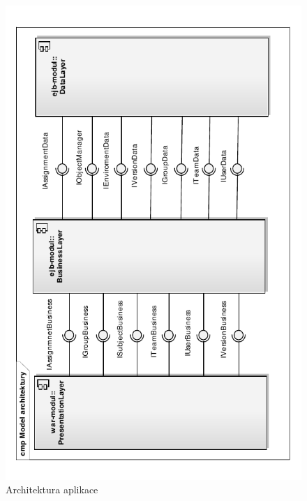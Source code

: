 \documentclass[11pt,twoside,a4paper]{book}
\begin{document}
\begin{figure}
\begin{center}
\includegraphics[angle=270]{images/architektura}
\caption{Architektura aplikace}
\label{img:architektura}
\end{center}
\end{figure}
\end{document}
